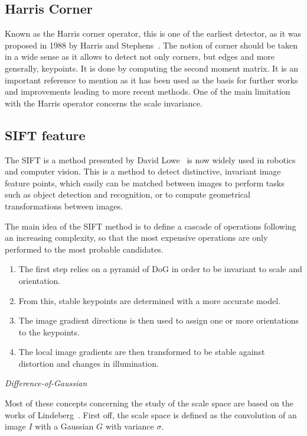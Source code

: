 \subsection{Harris Corner}

Known as the Harris corner operator, this is one of the earliest detector, as it was proposed in 1988 by Harris and Stephens~\cite{Harris88alvey}. The  notion of corner should be taken in a wide sense as it allows to detect not only corners, but edges and more generally, keypoints. It is done by computing the second moment matrix. It is an important reference to mention as it has been used as the basis for further works and improvements leading to more recent methods. One of the main limitation with the Harris operator concerns the scale invariance.

\subsection{SIFT feature}

The \gls{SIFT} is a method presented by David Lowe~\cite{lowe_2004_sift} is now widely used in robotics and computer vision.
This is a method to detect distinctive, invariant image feature points, which easily can be matched between images to perform tasks such as object detection and recognition, or to compute geometrical transformations between images.

The main idea of the \gls{SIFT} method is to define a cascade of operations following an increasing complexity, so that the most expensive operations are only performed to the most probable candidates.
\begin{enumerate}
\item The first step relies on a pyramid of \gls{DoG} in order to be invariant to scale and orientation.
\item From this, stable  keypoints are determined with a more accurate model.
\item The image gradient directions is then used to assign one or more orientations to the keypoints.
\item The local image gradients are then transformed to be stable against distortion and changes in illumination.
\end{enumerate}

\emph{Difference-of-Gaussian}

Most of these concepts concerning the study of the scale space are based on the works of Lindeberg~\cite{Lindeberg_1994}. First off, the scale space is defined as the convolution of an image $I$ with a Gaussian $G$ with variance $\sigma$.

